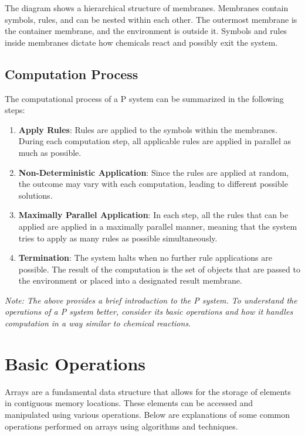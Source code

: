 \documentclass[12pt, oneside]{book}
\begin{document}
The diagram shows a hierarchical structure of membranes. Membranes contain symbols, rules, and can be nested within each other. The outermost membrane is the container membrane, and the environment is outside it. Symbols and rules inside membranes dictate how chemicals react and possibly exit the system.

\subsection{Computation Process}
The computational process of a P system can be summarized in the following steps:

\begin{enumerate}
	\item \textbf{Apply Rules}: Rules are applied to the symbols within the membranes. During each computation step, all applicable rules are applied in parallel as much as possible.
	
	\item \textbf{Non-Deterministic Application}: Since the rules are applied at random, the outcome may vary with each computation, leading to different possible solutions.
	
	\item \textbf{Maximally Parallel Application}: In each step, all the rules that can be applied are applied in a maximally parallel manner, meaning that the system tries to apply as many rules as possible simultaneously.
	
	\item \textbf{Termination}: The system halts when no further rule applications are possible. The result of the computation is the set of objects that are passed to the environment or placed into a designated result membrane.
\end{enumerate}

\textit{Note: The above provides a brief introduction to the P system. To understand the operations of a P system better, consider its basic operations and how it handles computation in a way similar to chemical reactions.}

\section{Basic Operations}

Arrays are a fundamental data structure that allows for the storage of elements in contiguous memory locations. These elements can be accessed and manipulated using various operations. Below are explanations of some common operations performed on arrays using algorithms and techniques.
\end{document}
